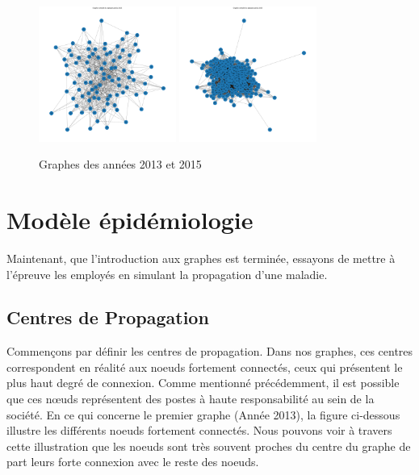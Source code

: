 \documentclass{article}
\begin{document}
\begin{figure}[!h]
    \centering
    \includegraphics[width=0.40\textwidth]{assets/proprietebase/2013}
    \hfill
    \includegraphics[width=0.40\textwidth]{assets/proprietebase/2015}
    \caption{Graphes des années 2013 et 2015}
    \label{fig:2013-2015}
\end{figure}

\section{Modèle épidémiologie}

Maintenant, que l'introduction aux graphes est terminée, essayons de mettre à l'épreuve les employés en simulant la propagation d'une maladie.

\subsection{Centres de Propagation}

Commençons par définir les centres de propagation. Dans nos graphes, ces centres correspondent en réalité aux noeuds fortement connectés, ceux qui présentent le plus haut degré de connexion. Comme mentionné précédemment, il est possible que ces nœuds représentent des postes à haute responsabilité au sein de la société. En ce qui concerne le premier graphe (Année 2013), la figure ci-dessous illustre les différents noeuds fortement connectés. Nous pouvons voir à travers cette illustration que les noeuds sont très souvent proches du centre du graphe de part leurs forte connexion avec le reste des noeuds.
\end{document}
